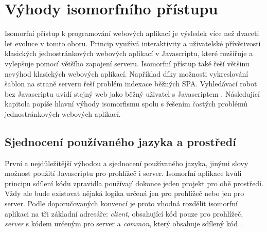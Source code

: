 \section{Výhody isomorfního přístupu}
Isomorfní přístup k programování webových aplikací je výsledek více než dvaceti let evoluce v tomto oboru. Princip využívá interaktivity a uživatelské přívětivosti klasických jednostránkových webových aplikací v Javascriptu, které rozšířuje a vylepšuje pomocí většího zapojení serveru. Isomorfní přístup také řeší většinu nevýhod klasických webových aplikací. Například díky možnosti vykreslování šablon na straně serveru řeší problém indexace běžných SPA. Vyhledávací robot bez Javascriptu uvidí stejný web jako běžný uživatel s Javascriptem \cite{isomorhic_book}. Následující kapitola popíše hlavní výhody isomorfismu spolu s řešením častých problémů jednostránkových webových aplikací.

\subsection{Sjednocení používaného jazyka a prostředí}
První a nejdůležitější výhodou a sjednocení používaného jazyka, jinými slovy možnost použití Javascriptu pro prohlížeč i server. Isomorfní aplikace kvůli principu sdílení kódu zpravidla používají dokonce jeden projekt pro obě prostředí. Vždy ale bude existovat nějaká logika určená jen pro prohlížeč nebo jen pro server. Podle doporučovaných konvencí je proto vhodná rozdělit isomorfní aplikaci na tři základní adresáře: \textit{client}, obsahující kód pouze pro prohlížeč, \textit{server} s kódem určeným pro server a \textit{common}, který obsahuje sdílený kód \cite{isomorhic_book}.

